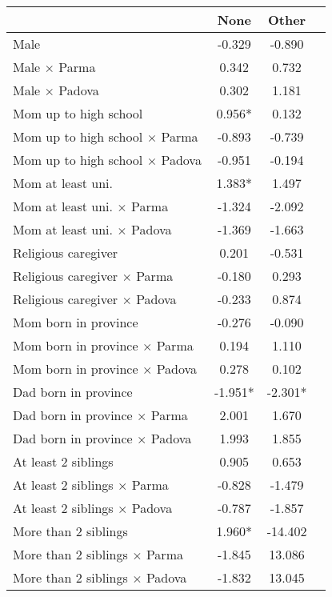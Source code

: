 \begin{tabular}{l c c c}
\toprule
& None & Other \\
\midrule
Male &    -0.329 &    -0.890 \\
Male $\times$ Parma &     0.342 &     0.732 \\
Male $\times$ Padova &     0.302 &     1.181 \\
Mom up to high school & 0.956* &     0.132 \\
Mom up to high school $\times$ Parma &    -0.893 &    -0.739 \\
Mom up to high school $\times$ Padova &    -0.951 &    -0.194 \\
Mom at least uni. & 1.383* &     1.497 \\
Mom at least uni. $\times$ Parma &    -1.324 &    -2.092 \\
Mom at least uni. $\times$ Padova &    -1.369 &    -1.663 \\
Religious caregiver &     0.201 &    -0.531 \\
Religious caregiver $\times$ Parma &    -0.180 &     0.293 \\
Religious caregiver $\times$ Padova &    -0.233 &     0.874 \\
Mom born in province &    -0.276 &    -0.090 \\
Mom born in province $\times$ Parma &     0.194 &     1.110 \\
Mom born in province $\times$ Padova &     0.278 &     0.102 \\
Dad born in province & -1.951* & -2.301* \\
Dad born in province $\times$ Parma &     2.001 &     1.670 \\
Dad born in province $\times$ Padova &     1.993 &     1.855 \\
At least 2 siblings &     0.905 &     0.653 \\
At least 2 siblings $\times$ Parma &    -0.828 &    -1.479 \\
At least 2 siblings $\times$ Padova &    -0.787 &    -1.857 \\
More than 2 siblings & 1.960* &   -14.402 \\
More than 2 siblings $\times$ Parma &    -1.845 &    13.086 \\
More than 2 siblings $\times$ Padova &    -1.832 &    13.045 \\
\bottomrule
\end{tabular}
